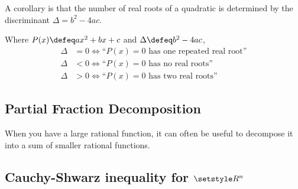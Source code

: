 A corollary is that the number of real roots of a quadratic is determined by the
discriminant \({\Delta = b^2 - 4ac}\).
\begin{corollary}
Where \(P(x) \defeq ax^2 + bx + c\) and \(\Delta \defeq b^2 - 4ac\),
\begin{align*}
\Delta &= 0 \iff \text{``\(P(x) = 0\) has one repeated real root''} \\
\Delta &< 0 \iff \text{``\(P(x) = 0\) has no real roots''} \\
\Delta &> 0 \iff \text{``\(P(x) = 0\) has two real roots''}
\end{align*}
\end{corollary}

\subsection{Partial Fraction Decomposition}

When you have a large rational function, it can often be useful to decompose it
into a sum of smaller rational functions.

\subsection[Cauchy-Shwarz inequality for
            \texorpdfstring{\(\Reals^n\)}{sequences of real numbers}]
           {Cauchy-Shwarz inequality for \boldmath\(\Reals^n\)}

